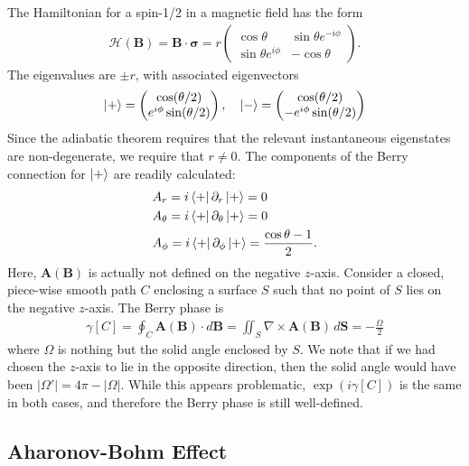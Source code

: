 \documentclass[reprint,
nofootinbib,
amsmath,amssymb,
aps]{revtex4-1}
\newcommand{\p}{\partial}
\newcommand{\f}[2]{\frac{#1}{#2}}
\begin{document}
The Hamiltonian for a spin-1/2 in a magnetic field has the form
\begin{align*}
\mathcal{H}(\bm{B}) = \bm{B}\cdot \bm{\sigma} = r \begin{pmatrix}
\cos\theta & \sin\theta e^{-i\phi} \\ \sin\theta e^{i\phi} & -\cos\theta
\end{pmatrix}.
\end{align*}
The eigenvalues are $\pm r$, with associated eigenvectors
\begin{align*}
\ket{+} = \begin{pmatrix}
\cos(\theta/2) \\ e^{i\phi}\sin(\theta/2) 
\end{pmatrix}, \quad \ket{-} = \begin{pmatrix}
\cos(\theta/2) \\ - e^{i\phi}\sin(\theta/2) 
\end{pmatrix} 
\end{align*}
Since the adiabatic theorem requires that the relevant instantaneous eigenstates are non-degenerate, we require that $r  \neq 0$. The components of the Berry connection for $\ket{+}$ are readily calculated:
\begin{align*}
&A_r = i\bra{+}\p_r \ket{+} = 0\\
&A_\theta = i\bra{+}\p_\theta\ket{+} = 0\\
&A_\phi = i\bra{+}\p_\phi \ket{+} = \f{\cos\theta - 1}{2}. 
\end{align*}
Here, $\bm{A}(\bm{B})$ is actually not defined on the negative $z$-axis. Consider a closed, piece-wise smooth path $C$ enclosing a surface $S$ such that no point of $S$ lies on the negative $z$-axis. The Berry phase is 
\begin{align*}
\gamma[C] = \oint_C \bm{A}(\bm{B}) \cdot d\bm{B} = \iint_S \nabla \times \bm{A}(\bm{B})  \, d\bm{S} = -\f{\Omega}{2} 
\end{align*}
where $\Omega$ is nothing but the solid angle enclosed by $S$. We note that if we had chosen the $z$-axis to lie in the opposite direction, then the solid angle would have been $|\Omega'| = 4\pi - |\Omega|$.  While this appears problematic,  $\exp(i\gamma[C])$ is the same in both cases, and therefore the Berry phase is still well-defined. 




\subsection{Aharonov-Bohm Effect}
\end{document}
